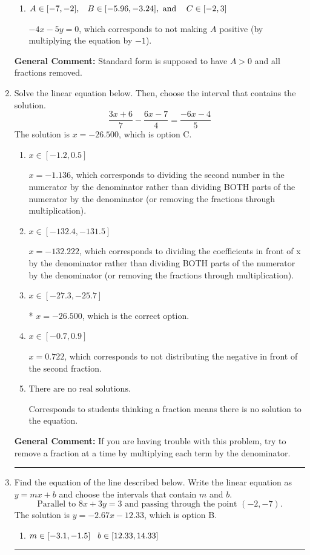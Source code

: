 \documentclass{extbook}[14pt]
\newcommand{\litem}[1]{\item #1

\rule{\textwidth}{0.4pt}}
\begin{document}
\begin{enumerate}
{\begin{enumerate}[label=\Alph*.]
 $0.8x - 1y = -0.0$, which corresponds to using the opposite (negative) slope of the graph and not removing rational values.
\item \( A \in [-7, -2], \hspace{3mm} B \in [-5.96, -3.24], \text{ and } \hspace{3mm} C \in [-2, 3] \)

 $-4x - 5y = 0$, which corresponds to not making $A$ positive (by multiplying the equation by $-1$).
\end{enumerate}

\textbf{General Comment:} Standard form is supposed to have $A > 0$ and all fractions removed.
}
\litem{
Solve the linear equation below. Then, choose the interval that contains the solution.
\[ \frac{3x + 6}{7} - \frac{6x -7}{4} = \frac{-6x -4}{5} \]The solution is \( x = -26.500 \), which is option C.\begin{enumerate}[label=\Alph*.]
\item \( x \in [-1.2, 0.5] \)

 $x = -1.136$, which corresponds to dividing the second number in the numerator by the denominator rather than dividing BOTH parts of the numerator by the denominator (or removing the fractions through multiplication).
\item \( x \in [-132.4, -131.5] \)

 $x = -132.222$, which corresponds to dividing the coefficients in front of x by the denominator rather than dividing BOTH parts of the numerator by the denominator (or removing the fractions through multiplication).
\item \( x \in [-27.3, -25.7] \)

* $x = -26.500$, which is the correct option.
\item \( x \in [-0.7, 0.9] \)

 $x = 0.722$, which corresponds to not distributing the negative in front of the second fraction.
\item \( \text{There are no real solutions.} \)

Corresponds to students thinking a fraction means there is no solution to the equation.
\end{enumerate}

\textbf{General Comment:} If you are having trouble with this problem, try to remove a fraction at a time by multiplying each term by the denominator.
}
\litem{
Find the equation of the line described below. Write the linear equation as $ y=mx+b $ and choose the intervals that contain $m$ and $b$.
\[ \text{Parallel to } 8 x + 3 y = 3 \text{ and passing through the point } (-2, -7). \]The solution is \( y = -2.67x - 12.33 \), which is option B.\begin{enumerate}[label=\Alph*.]
\item \( m \in [-3.1, -1.5] \hspace*{3mm} b \in [12.33, 14.33] \)


\end{enumerate}}
\end{enumerate}
\end{document}

